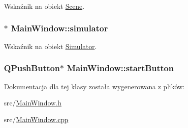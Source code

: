 Wskaźnik na obiekt \hyperlink{class_scene}{Scene}. 

\hypertarget{class_main_window_a0bb9399936b67eb8dba43b80443c0469}{
\subsubsection[{simulator}]{$\ast$ Main\-Window\-::simulator}}\label{class_main_window_a0bb9399936b67eb8dba43b80443c0469}


Wskaźnik na obiekt \hyperlink{class_simulator}{Simulator}. 

\hypertarget{class_main_window_a209284547cc0a28bb29f55e5fd4e570a}{
\subsubsection[{start\-Button}]{\setlength{\rightskip}{0pt plus 5cm}Q\-Push\-Button$\ast$ Main\-Window\-::start\-Button\hspace{0.3cm}{\ttfamily [protected]}}}\label{class_main_window_a209284547cc0a28bb29f55e5fd4e570a}


Dokumentacja dla tej klasy została wygenerowana z plików\-:\begin{DoxyCompactItemize}
\item 
src/\hyperlink{_main_window_8h}{Main\-Window.\-h}\item 
src/\hyperlink{_main_window_8cpp}{Main\-Window.\-cpp}\end{DoxyCompactItemize}

